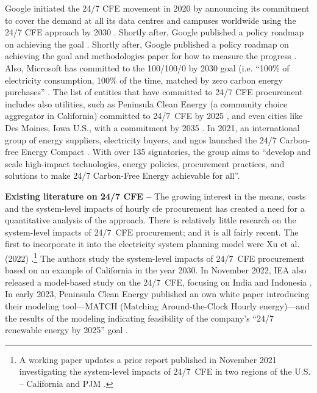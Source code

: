 \documentclass[11pt, 5p, nopreprintline]{elsarticle}
\begin{document}
Google initiated the 24/7 CFE movement in 2020 by announcing its commitment to cover the demand at all its data centres and campuses worldwide using the 24/7 CFE approach by 2030 \cite{google-247by2030}.
Shortly after, Google published a policy roadmap on achieving the goal \cite{google-PolicyRoadmap}.	Shortly after, Google published a policy roadmap on achieving the goal \cite{google-PolicyRoadmap} and methodologies paper for how to measure the progress \cite{google-methodologies}.
Also, Microsoft has committed to the 100/100/0 by 2030 goal (i.e. \enquote{100\% of electricity consumption, 100\% of the time, matched by zero carbon energy purchases} \cite{Microsoft-vision}.
The list of entities that have committed to 24/7 CFE procurement includes also utilities, such as Peninsula Clean Energy (a community choice aggregator in California) committed to 24/7~CFE by 2025 \cite{peninsula-OurPathto247}, and even cities like Des Moines, Iowa U.S., with a commitment by 2035 \cite{iowaenvcouncil-247}. In 2021, an international group of energy suppliers, electricity buyers, and \gls{ngo}s launched the 24/7 Carbon-free Energy Compact \cite{gocarbonfree247}.
With over 135 signatories, the group aims to \enquote{develop and scale high-impact technologies, energy policies, procurement practices, and solutions to make 24/7 Carbon-Free Energy achievable for all}.


\textbf{Existing literature on 24/7 CFE --} The growing interest in the means, costs and the system-level impacts of hourly \gls{cfe} procurement has created a need for a quantitative analysis of the approach.
There is relatively little research on the system-level impacts of 24/7~CFE procurement; and it is all fairly recent.
The first to incorporate it into the electricity system planning model were Xu et al. (2022) \cite{xu-247CFE-SSRN}.\footnote{A working paper updates a prior report published in November 2021 investigating the system-level impacts of 24/7~CFE in two regions of the U.S. -- California and PJM \cite{xu-247CFE-report}.}
The authors study the system-level impacts of 24/7~CFE procurement based on an example of California in the year 2030.
In November 2022, IEA also released a model-based study on the 24/7~CFE, focusing on India and Indonesia \cite{ieaAdvancingDecarbonisationClean2022}.
In early 2023, Peninsula Clean Energy published an own white paper introducing their modeling tool---MATCH (Matching Around-the-Clock Hourly energy)---and the results of the modeling indicating feasibility of the company's \enquote{24/7 renewable energy by 2025} goal \cite{peninsula-report247}.
\end{document}
